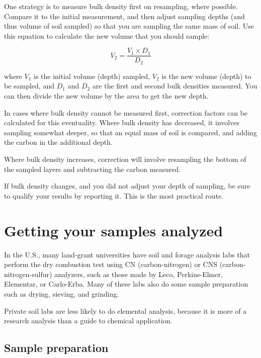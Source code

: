 \documentclass[11pt,letterpaper,oneside,onecolumn]{memoir}
\begin{document}
One strategy is to measure bulk density first on resampling, where possible. Compare it to the initial measurement, and then adjust sampling depths (and thus volume of soil sampled) so that you are sampling the same mass of soil. Use this equation to calculate the new volume that you should sample:

\begin{equation}V_{2} = \frac{V_{1}\times D_{1}}{D_{2}}\end{equation}

\noindent where $V_{1}$ is the initial volume (depth) sampled, $V_{2}$ is the new volume (depth) to be sampled, and $D_{1}$ and $D_{2}$ are the first and second bulk densities measured. You can then divide the new volume by the area to get the new depth.

In cases where bulk density cannot be measured first, correction factors can be calculated for this eventuality. Where bulk density has decreased, it involves sampling somewhat deeper, so that an equal mass of soil is compared, and adding the carbon in the additional depth.

Where bulk density increases, correction will involve resampling the bottom of the sampled layers and subtracting the carbon measured.

If bulk density changes, and you did not adjust your depth of sampling, be sure to qualify your results by reporting it. This is the most practical route.


\chapter{Getting your samples analyzed}

In the U.S., many land-grant universities have soil and forage analysis labs that perform the dry combustion test using CN (carbon-nitrogen) or CNS (carbon-nitrogen-sulfur) analyzers, such as those made by Leco, Perkins-Elmer, Elementar, or Carlo-Erba. Many of these labs also do some sample preparation such as drying, sieving, and grinding.

Private soil labs are less likely to do elemental analysis, because it is more of a research analysis than a guide to chemical application.

\section{Sample preparation}
\end{document}
